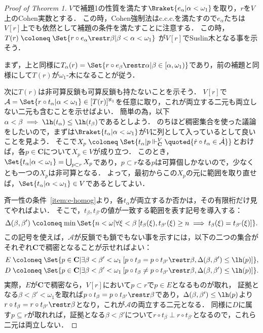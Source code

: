 \documentclass[a4j]{ltjsarticle}
\renewcommand{\defeq}{\mathrel{\coloneq}}
\begin{document}
\begin{proof}[Proof of Theorem 1]
 $V$で補題1の性質を満たす$\Braket{e_\alpha | \alpha < \omega_1}$を取り，$r$を$V$上のCohen実数とする．
 この時，Cohen強制法はc.c.c.を満たすので$e_\alpha$たちは$V[r]$上でも依然として補題の条件を満たすことに注意する．
 この時，$T(r) \defeq \Set{r \circ e_\alpha \restr \beta | \beta < \alpha < \omega_1}$ が$V[r]$でSuslin木となる事を示そう．

 まず，上と同様に$T_\alpha(r) = \Set{ r \circ e_\beta \restr \alpha | \beta \in [\alpha, \omega_1)}$であり，前の補題と同様にして$T(r)$が$\omega_1$-木になることが従う．

 次に$T(r)$は非可算反鎖も可算反鎖も持たないことを示そう．
 $V[r]$で$\mathcal{A} = \Set{ r \circ t_\alpha | \alpha < \omega_1} \in [T(r)]^{\aleph_1}$を任意に取り，これが両立する二元も両立しない二元も含むことを示せばよい．
 簡単の為，以下$\alpha < \beta \implies \lh(t_\alpha) \leq \lh(t_\beta)$であるとしよう．
 のちほど稠密集合を使った議論をしたいので，まずは$\Braket{t_\alpha | \alpha < \omega_1}$が$V$に列として入っているとして良いことを見よう．
 そこで$X_p \defeq \Set{t_\alpha | p \Vdash^{V}_{\mathbf{C}} \quoted{\dot{r} \circ t_\alpha \in \dot{\mathcal{A}}}}$とおけば，各$p \in \mathbf{C}$について$X_p \in V$が成り立つ．
 このとき，$\Set{t_\alpha | \alpha < \omega_1} = \bigcup_{p \subset r} X_p$であり，$p \subset r$なる$p$は可算個しかないので，少なくとも一つの$X_p$は非可算となる．
 よって，最初からこの$X_p$の元に範囲を取り直せば，$\Set{t_\alpha | \alpha < \omega_1} \in V$であるとしてよい．

 
 斉一性の条件~\ref{item:e-homog}より，各$t_\alpha$が両立するか否かは，その有限桁だけ見てやればよい．
 そこで，$t_\beta, t_{\beta'}$の値が一致する範囲を表す記号を導入する：
 \[
  \Delta(\beta, \beta') \defeq \min\Set{ n < \omega | \forall \xi < \beta \: [t_\beta(\xi), t_{\beta'}(\xi) \geq n \implies t_\beta(\xi) = t_{\beta'}(\xi)]}.
 \]
 この記号を使えば，$\mathcal{A}$が反鎖でも鎖でもない事を示すには，以下の二つの集合がそれぞれ$\mathbf{C}$で稠密となることが示せればよい：
 \begin{align*}
  E &\defeq \Set{p \in \mathbf{C} | \exists \beta < \beta' < \omega_1 \: [p \circ t_\beta = p \circ t_{\beta'} \restr \beta, \Delta(\beta, \beta') \leq \lh(p)] },\\
  D &\defeq \Set{p \in \mathbf{C} | \exists \beta < \beta' < \omega_1 \: [p \circ t_\beta \neq p \circ t_{\beta'} \restr \beta, \Delta(\beta, \beta') \leq \lh(p)]}.
 \end{align*}
 実際，$E$が$\mathbf{C}$で稠密なら，$V[r]$において$p \subset r$で$p \in E$となるものが取れ，
 証拠となる$\beta < \beta' < \omega_1$を取れば$p \circ t_\beta = p \circ t_{\beta'} \restr \beta$であり，$\Delta(\beta, \beta') \leq \lh(p)$より$r \circ t_\beta = r \circ t_{\beta'} \restr \beta$となり，これが$\mathcal{A}$の両立する二元となる．
 同様に$D$に属す$p \subseteq r$が取れれば，証拠となる$\beta < \beta'$について$r \circ t_{\beta} \perp r \circ t_{\beta'}$となるので，これら二元は両立しない．


\end{proof}
\end{document}
